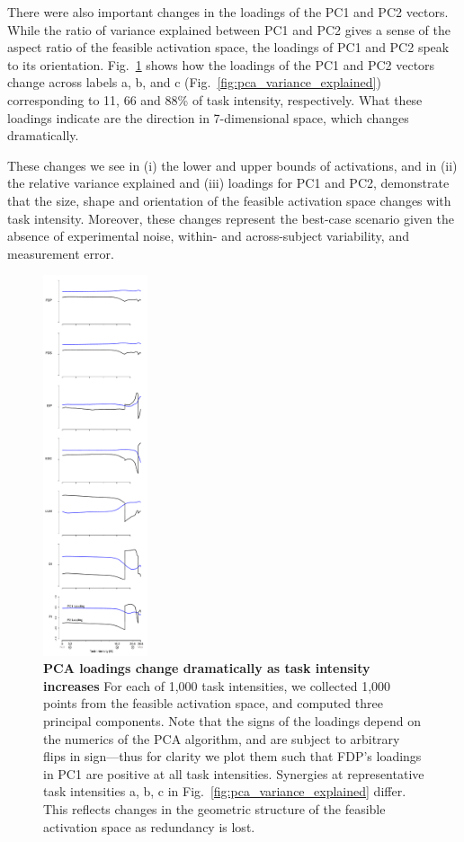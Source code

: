 \documentclass[9pt,twocolumn,twoside,lineno]{pnas-new}
\begin{document}
There were also important changes in the loadings of the PC1 and PC2 vectors. While the ratio of variance explained between PC1 and PC2 gives a sense of the aspect ratio of the feasible activation space, the loadings of PC1 and PC2 speak to its orientation.
Fig.~\ref{fig:pca_loadings_detail} shows how the loadings of the PC1 and PC2 vectors change across labels a, b, and c (Fig.~\ref{fig:pca_variance_explained}) corresponding to 11, 66 and 88\% of task intensity, respectively.
What these loadings indicate are the direction in 7-dimensional space, which changes dramatically.

These changes we see in (i) the lower and upper bounds of activations, and in (ii) the relative variance explained and (iii) loadings for PC1 and PC2, demonstrate that the size, shape and orientation of the feasible activation space changes with task intensity. Moreover, these changes represent the best-case scenario given the absence of experimental noise, within- and across-subject variability, and measurement error.


\begin{figure}[htbp]
\centering
\includegraphics[height=11.2cm]{supplemental_figures/pc_loadings_FDP_made_positive.pdf}
\caption{\textbf{PCA loadings change dramatically as task intensity increases} For each of 1,000 task intensities, we collected 1,000 points from the feasible activation space, and computed three principal components.
Note that the signs of the loadings depend on the numerics of the PCA algorithm, and are subject to arbitrary flips in sign---thus for clarity we plot them such that FDP's loadings in PC1 are positive at all task intensities.
Synergies at representative task intensities a, b, c in Fig.~\ref{fig:pca_variance_explained} differ. This reflects changes in the geometric structure of the feasible activation space as redundancy is lost.}
\label{fig:pca_loadings_detail}
\end{figure}
\end{document}
